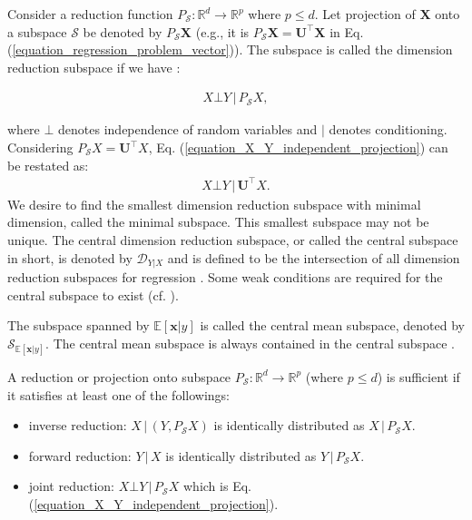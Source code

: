 \documentclass[lang=cn,10pt]{gorgeousnbook}
\numberwithin{equation}{section}%
\numberwithin{figure}{section}%
\begin{document}
\begin{definition}\label{definition_central_subspace}
Consider a reduction function $P_\mathcal{S}: \mathbb{R}^d \rightarrow \mathbb{R}^p$ where $p \leq d$.
Let projection of $\boldsymbol{X}$ onto a subspace $\mathcal{S}$ be denoted by $P_\mathcal{S} \boldsymbol{X}$ (e.g., it is $P_\mathcal{S} \boldsymbol{X} = \boldsymbol{U}^\top \boldsymbol{X}$ in Eq. (\ref{equation_regression_problem_vector})).
The subspace is called the dimension reduction subspace if we have \cite{li1991sliced,li1992principal}:

\begin{align}\label{equation_X_Y_independent_projection}
X \bot Y\, |\, P_\mathcal{S} X,
\end{align}

where $\bot$ denotes independence of random variables \cite{dawid1979conditional} and $|$ denotes conditioning. 
Considering $P_\mathcal{S} X = \boldsymbol{U}^\top X$, Eq. (\ref{equation_X_Y_independent_projection}) can be restated as:
\begin{align}\label{equation_X_Y_independent_projection_2}
X \bot Y\, |\, \boldsymbol{U}^\top X.
\end{align}
We desire to find the smallest dimension reduction subspace with minimal dimension, called the minimal subspace. This smallest subspace may not be unique. 
The central dimension reduction subspace, or called the central subspace in short, is denoted by $\mathcal{D}_{Y|X}$ and is defined to be the intersection of all dimension reduction subspaces for regression \cite{cook1994using,cook1996graphics}. Some weak conditions are required for the central subspace to exist (cf. \cite{cook1996graphics,cook1998regression}).
\end{definition}

\begin{definition}
The subspace spanned by $\mathbb{E}[\boldsymbol{x} | y]$ is called the central mean subspace, denoted by $\mathcal{S}_{\mathbb{E}[\boldsymbol{x} | y]}$.
The central mean subspace is always contained in the central subspace \cite{li2005contour}. 
\end{definition}

\begin{definition}\label{definition_sufficient_reduction}
A reduction or projection onto subspace $P_\mathcal{S}: \mathbb{R}^d \rightarrow \mathbb{R}^p$ (where $p \leq d$) is sufficient if it satisfies at least one of the followings:
\begin{itemize}
\item inverse reduction: $X\, |\, (Y, P_\mathcal{S} X)$ is identically distributed as $X\, |\, P_\mathcal{S} X$.
\item forward reduction: $Y\, |\, X$ is identically distributed as $Y\, |\, P_\mathcal{S} X$.
\item joint reduction: $X \bot Y\, |\, P_\mathcal{S} X$ which is Eq. (\ref{equation_X_Y_independent_projection}).
\end{itemize}
\end{definition}
\end{document}
